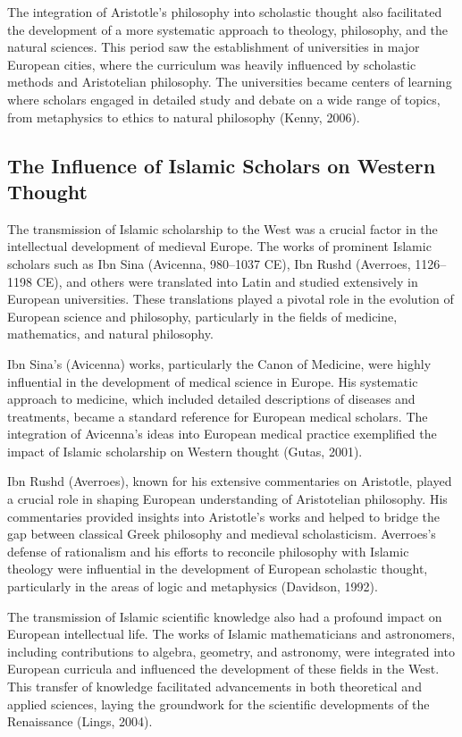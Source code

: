 \documentclass[twocolumn]{article}
\begin{document}
\textcolor{primary}{The integration of Aristotle’s philosophy into scholastic thought also facilitated the development of a more systematic approach to theology, philosophy, and the natural sciences. This period saw the establishment of universities in major European cities, where the curriculum was heavily influenced by scholastic methods and Aristotelian philosophy. The universities became centers of learning where scholars engaged in detailed study and debate on a wide range of topics, from metaphysics to ethics to natural philosophy (Kenny, 2006).} \\

\subsection{The Influence of Islamic Scholars on Western Thought}

\textcolor{primary}{The transmission of Islamic scholarship to the West was a crucial factor in the intellectual development of medieval Europe. The works of prominent Islamic scholars such as Ibn Sina (Avicenna, 980–1037 CE), Ibn Rushd (Averroes, 1126–1198 CE), and others were translated into Latin and studied extensively in European universities. These translations played a pivotal role in the evolution of European science and philosophy, particularly in the fields of medicine, mathematics, and natural philosophy.}

\textcolor{secondary}{Ibn Sina’s (Avicenna) works, particularly the Canon of Medicine, were highly influential in the development of medical science in Europe. His systematic approach to medicine, which included detailed descriptions of diseases and treatments, became a standard reference for European medical scholars. The integration of Avicenna’s ideas into European medical practice exemplified the impact of Islamic scholarship on Western thought (Gutas, 2001).}

\textcolor{primary}{Ibn Rushd (Averroes), known for his extensive commentaries on Aristotle, played a crucial role in shaping European understanding of Aristotelian philosophy. His commentaries provided insights into Aristotle’s works and helped to bridge the gap between classical Greek philosophy and medieval scholasticism. Averroes’s defense of rationalism and his efforts to reconcile philosophy with Islamic theology were influential in the development of European scholastic thought, particularly in the areas of logic and metaphysics (Davidson, 1992).}

\textcolor{secondary}{The transmission of Islamic scientific knowledge also had a profound impact on European intellectual life. The works of Islamic mathematicians and astronomers, including contributions to algebra, geometry, and astronomy, were integrated into European curricula and influenced the development of these fields in the West. This transfer of knowledge facilitated advancements in both theoretical and applied sciences, laying the groundwork for the scientific developments of the Renaissance (Lings, 2004).}
\end{document}
